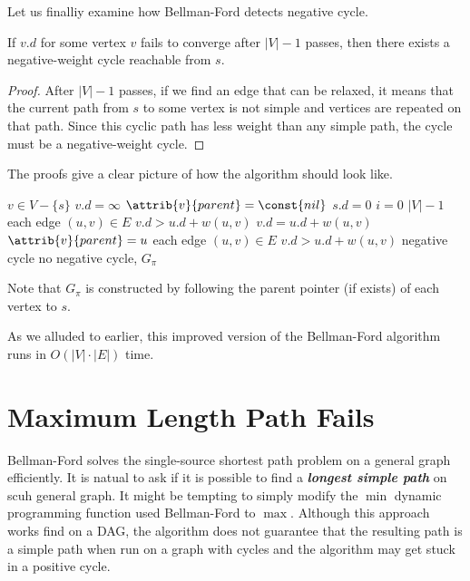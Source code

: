 Let us finalliy examine how Bellman-Ford detects negative cycle.

\begin{theorem}
    If $v.d$ for some vertex $v$ fails to converge after $|V|-1$ passes, then there exists a negative-weight cycle reachable from $s$.
\end{theorem}

\begin{proof}
    After $|V|-1$ passes, if we find an edge that can be relaxed, it means that the current path from $s$ to some vertex is not simple and vertices are repeated on that path. Since this cyclic path has less weight than any simple path, the cycle must be a negative-weight cycle.
\end{proof}

The proofs give a clear picture of how the algorithm should look like.

\begin{codebox}
    \li \For $v \in V - \{s\}$ \Do
        \li $v.d = \infty$
        \li $\attrib{v}{parent} = \const{nil}$
    \End
    \li $s.d = 0$
    \li \For $i = 0$ \To $|V|-1$ \Do
        \li \For each edge $(u,v) \in E$ \Do
            \li \If $v.d > u.d + w(u,v)$ \Then
                \li $v.d = u.d + w(u,v)$
                \li $\attrib{v}{parent} = u$
            \End
        \End
    \End
    \li \For each edge $(u,v) \in E$ \Do
        \li \If $v.d > u.d + w(u,v)$ \Then
            \li \Return negative cycle
        \End
    \End
    \li \Return no negative cycle, $G_\pi$ 
\end{codebox}
Note that $G_\pi$ is constructed by following the parent pointer (if exists) of each vertex to $s$.

As we alluded to earlier, this improved version of the Bellman-Ford algorithm runs in $O(|V|\cdot |E|)$ time.

\section{Maximum Length Path Fails}  

Bellman-Ford solves the single-source shortest path problem on a general graph efficiently. It is natual to ask if it is possible to find a \textit{\textbf{longest simple path}} on scuh general graph. It might be tempting to simply modify the $\min$ dynamic programming function used Bellman-Ford to $\max$. Although this approach works find on a DAG, the algorithm does not guarantee that the resulting path is a simple path when run on a graph with cycles and the algorithm may get stuck in a positive cycle.


